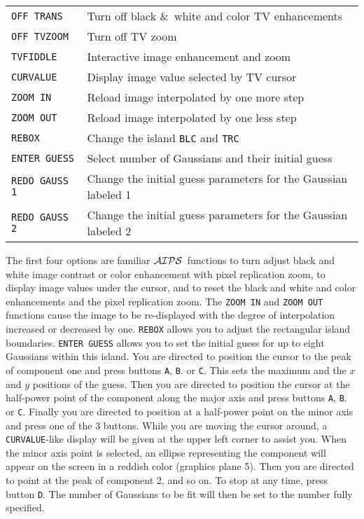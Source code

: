 \documentclass[twoside]{article}
\newcommand{\AIPS}{{$\cal AIPS\/$}}
\begin{document}
\begin{center}
\begin{tabular}{|l|l|}\hline
 {\tt OFF TRANS   } & Turn off black \&\ white and color TV
                      enhancements\\
 {\tt OFF TVZOOM  } & Turn off TV zoom\\
 {\tt TVFIDDLE    } & Interactive image enhancement and zoom \\
 {\tt CURVALUE    } & Display image value selected by TV cursor \\
 {\tt ZOOM IN     } & Reload image interpolated by one more step \\
 {\tt ZOOM OUT    } & Reload image interpolated by one less step \\
 {\tt REBOX       } & Change the island {\tt BLC} and {\tt TRC} \\
 {\tt ENTER GUESS } & Select number of Gaussians and their initial
                      guess \\
 {\tt REDO GAUSS 1} & Change the initial guess parameters for the
                      Gaussian labeled 1 \\
 {\tt REDO GAUSS 2} & Change the initial guess parameters for the
                      Gaussian labeled 2 \\ \hline
\end{tabular}
\end{center}

The first four options are familiar \AIPS\ functions to turn adjust
black and white image contrast or color enhancement with pixel
replication zoom, to display image values under the cursor, and to
reset the black and white and color enhancements and the pixel
replication zoom.  The {\tt ZOOM IN} and {\tt ZOOM OUT} functions
cause the image to be re-displayed with the degree of interpolation
increased or decreased by one.  {\tt REBOX} allows you to adjust the
rectangular island boundaries.  {\tt ENTER GUESS} allows you to set
the initial guess for up to eight Gaussians within this island.  You
are directed to position the cursor to the peak of component one and
press buttons {\tt A}, {\tt B}. or {\tt C}\@.  This sets the maximum
and the $x$ and $y$ positions of the guess.  Then you are directed to
position the cursor at the half-power point of the component along the
major axis and press buttons {\tt A}, {\tt B}. or {\tt C}\@.  Finally
you are directed to position at a half-power point on the minor axis
and press one of the 3 buttons.  While you are moving the cursor
around, a {\tt CURVALUE}-like display will be given at the upper left
corner to assist you.  When the minor axis point is selected, an
ellipse representing the component will appear on the screen in a
reddish color (graphics plane 5).  Then you are directed to point at
the peak of component 2, and so on.  To stop at any time, press button
{\tt D}\@.  The number of Gaussians to be fit will then be set to the
number fully specified.
\end{document}
